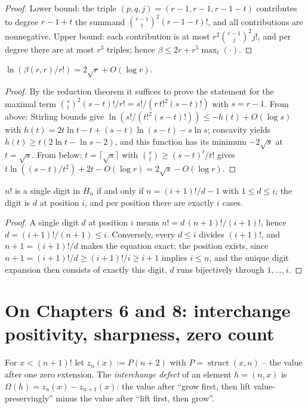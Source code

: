 \begin{proof}
Lower bound: the triple $(p,q,j)=(r{-}1,r{-}1,r{-}1{-}t)$
contributes to degree $r{-}1{+}t$ the summand
$\binom{r-1}{t}^2(r{-}1{-}t)!$, and all contributions are
nonnegative. Upper bound: each contribution is at most
$r^2\binom{r-1}{j}^2j!$, and per degree there are at most $r^3$
triples; hence $\beta\le2r+r^5\max_t(\cdot)$.
\end{proof}

\begin{satz}
$\ln(\beta(r,r)/r!)=2\sqrt r+O(\log r)$.
\end{satz}

\begin{proof}
By the reduction theorem it suffices to prove the statement for
the maximal term
$\binom st^2(s-t)!/r!=s!/(r\,t!^2(s-t)!)$ with $s=r-1$. From
above: Stirling bounds give
$\ln(s!/(t!^2(s-t)!))\le-h(t)+O(\log s)$
with $h(t)=2t\ln t-t+(s{-}t)\ln(s{-}t)-s\ln s$; concavity yields
$h(t)\ge t(2\ln t-\ln s-2)$, and this function has its minimum
$-2\sqrt s$ at $t=\sqrt s$. From below: $t=\lceil\sqrt s\rceil$
with $\binom st\ge(s-t)^t/t!$ gives
$t\ln((s-t)/t^2)+2t-O(\log r)=2\sqrt s-O(\log r)$.
\end{proof}

\begin{satz}
$n!$ is a single digit in $H_n$ if and only if $n=(i{+}1)!/d-1$
with $1\le d\le i$; the digit is $d$ at position $i$, and per
position there are exactly $i$ cases.
\end{satz}

\begin{proof}
A single digit $d$ at position $i$ means $n!=d\,(n+1)!/(i+1)!$,
hence $d=(i+1)!/(n+1)\le i$. Conversely, every $d\le i$ divides
$(i+1)!$, and $n+1=(i+1)!/d$ makes the equation exact; the
position exists, since $n{+}1=(i{+}1)!/d\ge(i{+}1)!/i\ge
i{+}1$ implies $i\le n$, and the unique digit expansion then
consists of exactly this digit.
$d$ runs bijectively through $1,\ldots,i$.
\end{proof}

\section*{On Chapters 6 and 8: interchange positivity, sharpness,
zero count}

For $x<(n{+}1)!$ let $z_n(x):=P(n{+}2)$ with
$P=\operatorname{struct}(x,n)$ -- the value after one zero
extension. The \emph{interchange defect} of an element
$h=(n,x)$ is
$\Omega(h)=z_n(x)-z_{n+1}(x)$: the value after ``grow first, then
lift value-preservingly'' minus the value after ``lift first, then
grow''.

